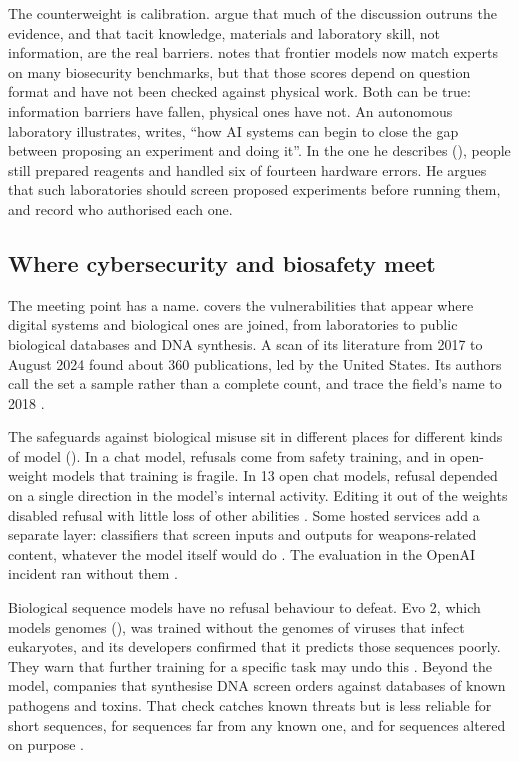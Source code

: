 The counterweight is calibration. \textcite{peppin2025biorisk} argue that much
of the discussion outruns the evidence, and that tacit knowledge, materials and
laboratory skill, not information, are the real barriers.
\textcite{turner2026biosecuritybenchmarks} notes that frontier models now match
experts on many biosecurity benchmarks, but that those scores depend on question
format and have not been checked against physical work. Both can be true:
information barriers have fallen, physical ones have not. An autonomous
laboratory illustrates, \textcite{zou2026wetlab} writes, ``how AI systems can
begin to close the gap between proposing an experiment and doing it''. In the one he
describes (), people still prepared reagents and
handled six of fourteen hardware errors. He argues that such laboratories should screen
proposed experiments before running them, and record who authorised each one.

\subsection{Where cybersecurity and biosafety meet}

The meeting point has a name.  covers the
vulnerabilities that appear where digital systems and biological ones are
joined, from laboratories to public biological databases and DNA synthesis. A scan of its literature from 2017 to August 2024 found about 360
publications, led by the United States. Its authors call the set a sample
rather than a complete count, and trace the field's name to 2018
\parencite{ranjan2025cyberbiosecurity}.

The safeguards against biological misuse sit in different places for
different kinds of model (). In a chat model, refusals
come from safety training, and in open-weight models that training is fragile.
In 13 open chat models, refusal depended on a single direction in the model's
internal activity. Editing it out of the weights disabled refusal with little
loss of other abilities \parencite{arditi2024refusal}. Some hosted services
add a separate layer: classifiers that screen inputs and outputs for weapons-related
content, whatever the model itself would do \parencite{sharma2025classifiers}.
The evaluation in the OpenAI incident ran without them
\parencite{openai2026huggingface}.

Biological sequence models have no refusal behaviour to defeat. Evo 2, which
models genomes (), was trained without the genomes of
viruses that infect eukaryotes, and its developers confirmed that it predicts
those sequences poorly. They warn that further training for a specific task
may undo this \parencite{brixi2026evo2}. Beyond the model, companies that
synthesise DNA screen orders against databases of known pathogens and toxins.
That check catches known threats but is less reliable for short sequences,
for sequences far from any known one, and for sequences altered on purpose
\parencite{holko2026relationalbiosecurity,turner2026biosecuritybenchmarks}.

